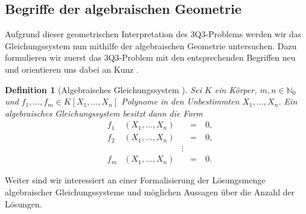 \documentclass[a4paper,oneside, 11pt, openany%
]{article}
\newcommand{\N}{{\mathbb N}}
\theoremstyle{custom}
\theoremstyle{custom}
\newtheorem{definition}[theorem]{Definition}
\begin{document}
	\subsection{Begriffe der algebraischen Geometrie}
	Aufgrund dieser geometrischen Interpretation des 3Q3-Problems werden wir das Gleichungssystem nun mithilfe der algebraischen Geometrie untersuchen. Dazu formulieren wir zuerst das 3Q3-Problem mit den entsprechenden Begriffen neu und orientieren uns dabei an Kunz \cite{kunz2012introduction,kunz2013}.
	
	\begin{definition}[Algebraisches Gleichungssystem {\cite{kunz2013}}]\label{def:alg_gs}
		Sei $K$ ein Körper, $m,n \in \N_{0}$ und $f_1,\ldots,f_m \in K\left[X_{1},\ldots,X_n\right]$ Polynome in den Unbestimmten $X_1,\ldots,X_n$. Ein algebraisches Gleichungssystem besitzt dann die Form
		\begin{equation}\label{eqn:alg_gs}
			\begin{alignedat}{5}
				&f_{1}&\left(X_{1}, \ldots, X_{n} \right)& \ &=\ &0,\\
				&f_{2}&\left(X_{1}, \ldots, X_{n} \right)& \ &=\ &0,\\
				&&&  \vdots& &\\
				&f_{m}&\left(X_{1}, \ldots, X_{n} \right)& \ &=\ &0.
			\end{alignedat}
		\end{equation}
	\end{definition} 
	Weiter sind wir interessiert an einer Formalisierung der Lösungsmenge algebraischer Gleichungssysteme und möglichen Aussagen über die Anzahl der Lösungen.
	
\end{document}
